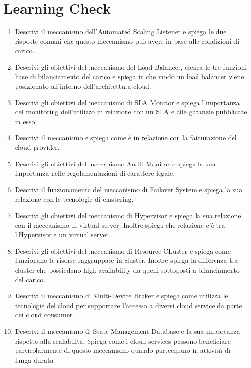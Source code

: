 \section{Learning Check}
\begin{enumerate}
    \item Descrivi il meccanismo dell'Automated Scaling Listener e spiega le due risposte comuni che questo meccanismo può avere in base alle condizioni di carico.
    \item Descrivi gli obiettivi del meccanismo del Load Balancer, elenca le tre funzioni base di bilanciamento del carico e spiega in che modo un load balancer viene posizionato all'interno dell'architettura cloud.
    \item Descrivi gli obiettivi del meccanismo di SLA Monitor e spiega l'importanza del monitoring dell'utilizzo in relazione con un SLA e alle garanzie pubblicate in esso.
    \item Descrivi il meccanismo e spiega come è in relazione con la fatturazione del cloud provider.
    \item Descrivi gli obiettivi del meccanismo Audit Monitor e spiega la sua importanza nelle regolamentazioni di carattere legale.
    \item Descrivi il funzionamento del meccanismo di Failover System e spiega la sua relazione con le tecnologie di clustering.
    \item Descrivi gli obiettivi del meccanismo di Hypervisor e spiega la sua relazione con il meccanismo di virtual server. Inoltre spiega che relazione c'è tra l'Hypervisor e un virtual server.
    \item Descrivi gli obiettivi del meccanismo di Resource CLuster e spiega come funzionano le risorse raggruppate in cluster. Inoltre spiega la differenza tra cluster che possiedono high availability da quelli sottoposti a bilanciamento del carico.
    \item Descrivi il meccanismo di Multi-Device Broker e spiega come utilizza le tecnologie del cloud per supportare l'accesso a diversi cloud service da parte dei cloud consumer.
    \item Descrivi il meccanismo di State Management Database e la sua importanza rispetto alla scalabilità. Spiega come i cloud services possono beneficiare particolarmente di questo meccanismo quando partecipano in attività di lunga durata.
\end{enumerate} 



